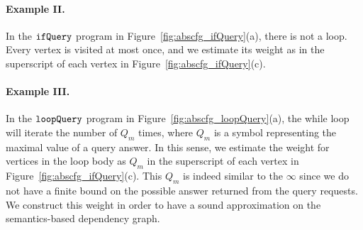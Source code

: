 \paragraph{Example II.}
In the $\mathtt{ifQuery}$ program in Figure~\ref{fig:abscfg_ifQuery}(a), there is not a loop.
Every vertex is visited at most once, and we estimate its weight as in the
superscript of each vertex in Figure~\ref{fig:abscfg_ifQuery}(c).

\paragraph{Example III.}
In the $\mathtt{loopQuery}$ program in Figure~\ref{fig:abscfg_loopQuery}(a), 
the while loop will iterate the number of $Q_m$ times, where $Q_m$ is a symbol representing the maximal value of a query answer.
In this sense, we estimate the weight for vertices in the loop body as $Q_m$ in the
superscript of each vertex in Figure~\ref{fig:abscfg_ifQuery}(c).
This $Q_m$ is indeed similar to the $\infty$ since we do not have a finite bound on the possible answer returned from the query requests.
We construct this weight in order to have a sound approximation on the semantics-based dependency graph.